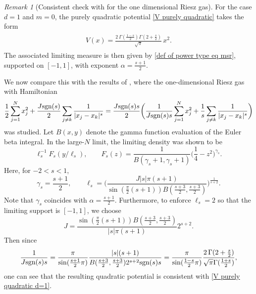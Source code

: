 \documentclass[10pt]{amsart}
\theoremstyle{plain}
\theoremstyle{remark}
\newtheorem{rem}{Remark}
\numberwithin{equation}{section}
\begin{document}
\begin{rem}[Consistent check with \cite{ADKKMMS19} for the one dimensional Riesz gas]
For the case $d=1$ and $m=0$, the purely quadratic potential \eqref{V purely quadratic} takes the form 
\begin{align}
\begin{split} \label{V purely quadratic d=1}
V(x) =    \frac{ 2\, \Gamma( \frac{1-s}{2}) \Gamma( 2+\frac{s}{2}) }{ \sqrt{\pi}  } \, x^2 . 
\end{split}
\end{align} 
The associated limiting measure is then given by \eqref{def of power type eq msr}, supported on $[-1,1]$, with exponent $\alpha=\tfrac{s+1}{2}$.

We now compare this with the results of \cite{ADKKMMS19}, where the one-dimensional Riesz gas with Hamiltonian
\begin{equation}
\frac12 \sum_{j=1}^N x_j^2 + \frac{J \textup{sgn}(s)}{ 2} \sum_{ j\not=k } \frac{1}{|x_j-x_k|^s} =  \frac{J \textup{sgn}(s) s} {2}\bigg(   \frac{1}{J \textup{sgn}(s) s} \sum_{j=1}^N x_j^2 + \frac{1}{s} \sum_{ j\not=k } \frac{1}{|x_j-x_k|^s}  \bigg)
\end{equation}
was studied. Let $B(x,y)$ denote the gamma function evaluation of the Euler beta integral. In the large-$N$ limit, the limiting density was shown to be
\begin{equation}
\ell_s^{-1} F_s( y/\ell_s ), \qquad F_s(z)= \frac{1}{ B( \gamma_s+1, \gamma_s+1 ) } \Big( \frac14-z^2\Big)^{ \gamma_s }.
\end{equation}
Here, for $-2<s<1$, 
\begin{equation}
\gamma_s=  \frac{s+1}{2}, \qquad 
\ell_s = \Big( \frac{ J |s| \pi (s+1) }{ \sin( \frac{\pi}{2}(s+1) )  B(\frac{s+3}{2},\frac{s+3}{2}) } \Big)^{ \frac{1}{s+2} }. 
\end{equation} 
Note that $\gamma_s$ coincides with $\alpha=\tfrac{s+1}{2}$.  
Furthermore, to enforce $\ell_s=2$ so that the limiting support is $[-1,1]$, we choose
\begin{equation}
J= \frac{ \sin( \frac{\pi}{2}(s+1) )  B(\frac{s+3}{2},\frac{s+3}{2}) }{  |s| \pi (s+1) } 2^{s+2}.
\end{equation}
Then since
\begin{align*}
\frac{1}{ J \textup{sgn}(s) s}= \frac{\pi}{  \sin( \frac{s+1}{2}\pi )  } \frac{  |s|   (s+1) }{  B(\frac{s+3}{2},\frac{s+3}{2}) 2^{s+2} \textup{sgn}(s) s }  =   \frac{\pi   }{ \sin( \frac{1-s}{2} \pi ) } \frac{ 2\, \Gamma( 2+\frac{s}{2}) }{ \sqrt{\pi} \Gamma( \frac{1+s}{2}) },
\end{align*}
one can see that the resulting quadratic potential is consistent with \eqref{V purely quadratic d=1}.
\end{rem}
\end{document}
